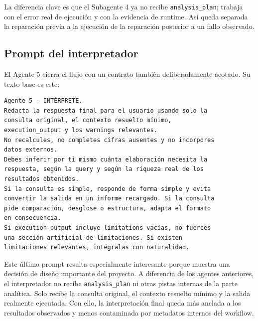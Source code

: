 La diferencia clave es que el Subagente 4 ya no recibe
\texttt{analysis\_plan}; trabaja con el error real de ejecuci\'on y con la
evidencia de runtime. As\'i queda separada la reparaci\'on previa a la
ejecuci\'on de la reparaci\'on posterior a un fallo observado.

\subsection{Prompt del interpretador}

El Agente 5 cierra el flujo con un contrato tambi\'en deliberadamente acotado. Su texto base es este:

\begin{lstlisting}[style=promptblock]
Agente 5 - INTÉRPRETE.
Redacta la respuesta final para el usuario usando solo la
consulta original, el contexto resuelto mínimo,
execution_output y los warnings relevantes.
No recalcules, no completes cifras ausentes y no incorpores
datos externos.
Debes inferir por ti mismo cuánta elaboración necesita la
respuesta, según la query y según la riqueza real de los
resultados obtenidos.
Si la consulta es simple, responde de forma simple y evita
convertir la salida en un informe recargado. Si la consulta
pide comparación, desglose o estructura, adapta el formato
en consecuencia.
Si execution_output incluye limitations vacías, no fuerces
una sección artificial de limitaciones. Si existen
limitaciones relevantes, intégralas con naturalidad.
\end{lstlisting}

Este \'ultimo prompt resulta especialmente interesante porque muestra una decisi\'on de dise\~no importante del proyecto. A diferencia de los agentes
anteriores, el interpretador no recibe \texttt{analysis\_plan} ni otras pistas internas de la parte anal\'itica. Solo recibe la consulta original, el contexto
resuelto m\'inimo y la salida realmente ejecutada. Con ello, la interpretaci\'on final queda m\'as anclada a los resultados observados y menos contaminada por
metadatos internos del workflow.
